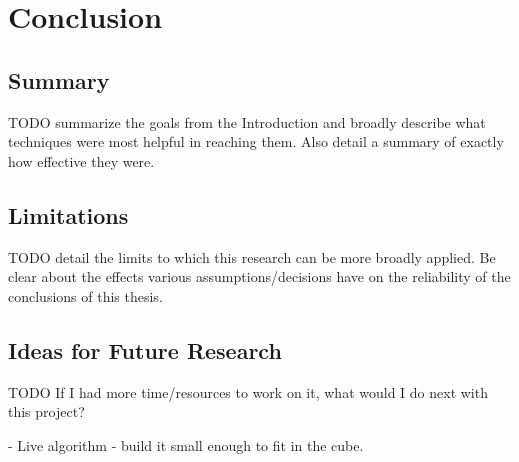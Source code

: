 
\chapter{Conclusion} %

\label{Chapter8} %


\section{Summary}
TODO summarize the goals from the Introduction and broadly describe what techniques were most helpful in reaching them. Also detail a summary of exactly how effective they were.


\section{Limitations}

TODO detail the limits to which this research can be more broadly applied. Be clear about the effects various assumptions/decisions have on the reliability of the conclusions of this thesis.


\section{Ideas for Future Research}

TODO If I had more time/resources to work on it, what would I do next with this project?

- Live algorithm
- build it small enough to fit in the cube.